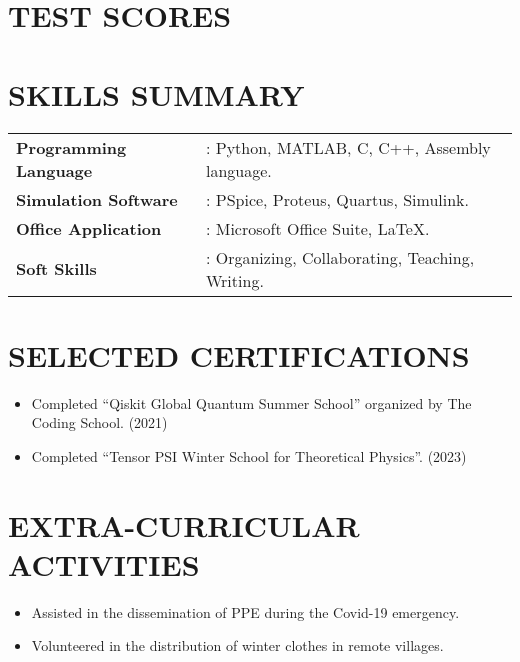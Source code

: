 \documentclass[letterpaper,11pt]{article}
\begin{document}
\section*{\textbf{TEST SCORES}}


\section*{\textbf{SKILLS SUMMARY}}
\begin{tabular}{@{}p{} p{}}
    \textbf{Programming Language} & : Python, MATLAB, C, C++, Assembly language.\\
    \textbf{Simulation Software} & : PSpice, Proteus, Quartus, Simulink. \\
    \textbf{Office Application} & : Microsoft Office Suite, LaTeX.\\
     \textbf{Soft Skills} & : Organizing, Collaborating, Teaching, Writing. \\
\end{tabular}

\section*{\textbf{SELECTED CERTIFICATIONS}}
\begin{itemize}[left=0cm]
    \setlength\itemsep{-0.075em} %
    \setlength\parskip{-0.075em} %
\raggedright
    \item Completed ``Qiskit Global Quantum Summer School'' organized by The Coding School. (2021)
    \item Completed ``Tensor PSI Winter School for Theoretical Physics''. (2023)
\end{itemize}


\section*{\textbf{EXTRA-CURRICULAR ACTIVITIES}}
\begin{itemize}[left=0cm]
    \setlength\itemsep{-0.075em} %
    \setlength\parskip{-0.075em} %
\raggedright
    \item Assisted in the dissemination of PPE during the Covid-19 emergency.
    \item Volunteered in the distribution of winter clothes in remote villages.
\end{itemize}
\end{document}
